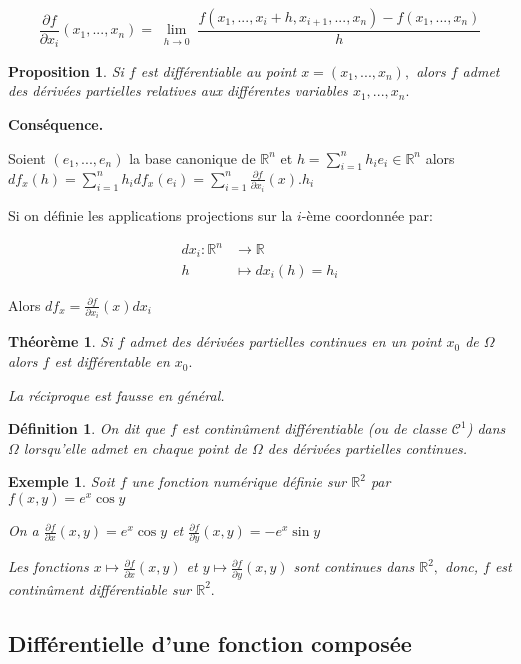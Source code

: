 \documentclass[11pt,a4paper]{report}
\newtheorem{theorem}{Théorème}[section]
\newtheorem{definition}{Définition}[section]
\newtheorem{proposition}{Proposition}[section]
\newtheorem{ex}{Exemple}[section]
\begin{document}
$$\frac{\partial f}{\partial x_i}(x_1,...,x_n)=\lim\limits_{\substack{h \rightarrow 0}}\frac{f(x_1,...,x_i+h,x_{i+1},...,x_n)-f(x_1,...,x_n)}{h}$$
\begin{proposition}
Si $f$ est différentiable au point $x=(x_1,...,x_n),$ alors $f$ admet des dérivées partielles relatives aux différentes variables $x_1,...,x_n.$
\end{proposition}
\textbf{Conséquence.}

Soient $(e_1,...,e_n)$ la base canonique de $\mathbb{R}^n$ et $h=\sum_{i=1}^{n}h_i e_i\in \mathbb{R}^n$ alors $df_x(h)=\sum_{i=1}^{n}h_i df_x (e_i)=\sum_{i=1}^{n}\frac{\partial f}{\partial x_i}(x).h_i$

Si on définie les applications projections sur la $i$-ème coordonnée par:

\begin{align*}
dx_i:\mathbb{R}^n &\rightarrow \mathbb{R}\\
h&\mapsto d x_i (h)=h_i
\end{align*}

Alors $df_x=\frac{\partial f}{\partial x_i}(x) dx_i$

\begin{theorem}

Si $f$ admet des dérivées partielles continues en un point $x_0$ de $\Omega$ alors $f$ est différentable en $x_0.$

La réciproque est fausse en général.
\end{theorem}

\begin{definition}
On dit que $f$ est continûment différentiable (ou de classe $\mathcal{C}^1$) dans $\Omega$ lorsqu'elle admet en chaque point de $\Omega$ des dérivées partielles continues.
\end{definition}

\begin{ex}

Soit $f$ une fonction numérique définie sur $\mathbb{R}^2$ par $f(x,y)=e^x \cos y$

On a $\frac{\partial f}{\partial x}(x,y)=e^x \cos y$ et $\frac{\partial f}{\partial y}(x,y)=-e^x \sin y$

Les fonctions $x\mapsto \frac{\partial f}{\partial x}(x,y)$ et $y\mapsto \frac{\partial f}{\partial y}(x,y)$ sont continues dans $\mathbb{R}^2,$ donc, $f$ est continûment différentiable sur $\mathbb{R}^2.$
\end{ex}
\subsection{Différentielle d'une fonction composée}
\end{document}

